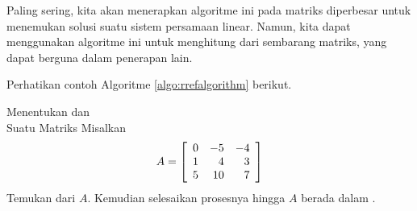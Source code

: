 Paling sering, kita akan menerapkan algoritme ini pada matriks diperbesar untuk menemukan solusi
suatu sistem persamaan linear. Namun, kita dapat menggunakan algoritme ini untuk menghitung \rref \;dari sembarang matriks, yang dapat berguna dalam penerapan lain.

Perhatikan contoh Algoritme \ref{algo:rrefalgorithm} berikut.

\begin{example}{Menentukan \EF{} dan \\ \RREF{} Suatu Matriks}\label{exa:findingechelonandrref}
Misalkan
\begin{equation*}
A = \left[
\begin{array}{rrr}
0 & -5 & -4 \\
1 & 4 & 3 \\
5 & 10 & 7
\end{array}
\right]
\end{equation*}
Temukan \ef \;dari $A$. Kemudian selesaikan
prosesnya hingga $A$ berada dalam \rref.
\end{example}

